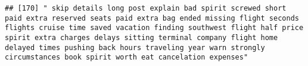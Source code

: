 \documentclass[
]{article}
\begin{document}
\begin{verbatim}
## [170] " skip details long post explain bad spirit screwed short paid extra reserved seats paid extra bag ended missing flight seconds flights cruise time saved vacation finding southwest flight half price spirit extra charges delays sitting terminal company flight home delayed times pushing back hours traveling year warn strongly circumstances book spirit worth eat cancelation expenses"                                                                                                                                                                                                                                                                                                                                                                                                                                                                                                                                                                                                                                                                                                                                                                                                                                                                                                                                                                                                                                                                                                                                                                                                                                                                                                                                                                                                 

\end{verbatim}
\end{document}
